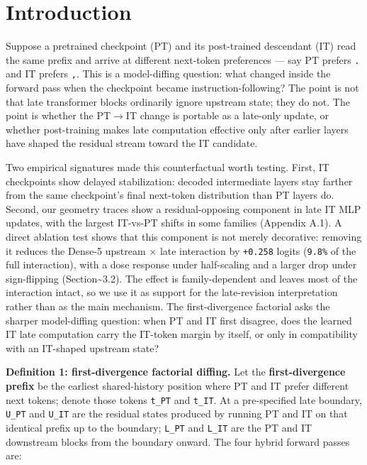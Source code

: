 \documentclass[11pt]{article}
\begin{document}
\section{Introduction}

Suppose a pretrained checkpoint (PT) and its post-trained descendant (IT) read the same prefix and arrive at different next-token preferences --- say PT prefers \texttt{.} and IT prefers \texttt{,}. This is a model-diffing question: what changed inside the forward pass when the checkpoint became instruction-following? The point is not that late transformer blocks ordinarily ignore upstream state; they do not. The point is whether the PT\ensuremath{\to}IT change is portable as a late-only update, or whether post-training makes late computation effective only after earlier layers have shaped the residual stream toward the IT candidate.

Two empirical signatures made this counterfactual worth testing. First, IT checkpoints show delayed stabilization: decoded intermediate layers stay farther from the same checkpoint's final next-token distribution than PT layers do. Second, our geometry traces show a residual-opposing component in late IT MLP updates, with the largest IT-vs-PT shifts in some families (Appendix A.1). A direct ablation test shows that this component is not merely decorative: removing it reduces the Dense-5 upstream \ensuremath{\times} late interaction by \texttt{+0.258} logits (\texttt{9.8\%} of the full interaction), with a dose response under half-scaling and a larger drop under sign-flipping (Section\textasciitilde{}3.2). The effect is family-dependent and leaves most of the interaction intact, so we use it as support for the late-revision interpretation rather than as the main mechanism. The first-divergence factorial asks the sharper model-diffing question: when PT and IT first disagree, does the learned IT late computation carry the IT-token margin by itself, or only in compatibility with an IT-shaped upstream state?

\textbf{Definition 1: first-divergence factorial diffing.} Let the \textbf{first-divergence prefix} be the earliest shared-history position where PT and IT prefer different next tokens; denote those tokens \texttt{t\_PT} and \texttt{t\_IT}. At a pre-specified late boundary, \texttt{U\_PT} and \texttt{U\_IT} are the residual states produced by running PT and IT on that identical prefix up to the boundary; \texttt{L\_PT} and \texttt{L\_IT} are the PT and IT downstream blocks from the boundary onward. The four hybrid forward passes are:
\end{document}
